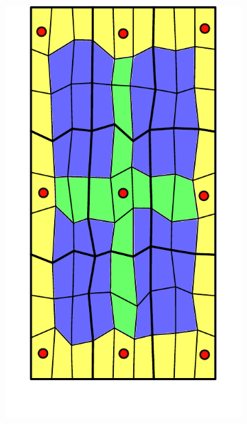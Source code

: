 \begin{figure} [htbp]
\begin{subfigure}[t]{0.22\textwidth}
  \centerline{\includegraphics[width=\linewidth]{figs/MPFA_9x9_b}}
  \caption{\label{fig:mpfa_demo_support}}
\end{subfigure}
\hfill
\begin{subfigure}[t]{0.22\textwidth}

\end{subfigure}
\end{figure}
